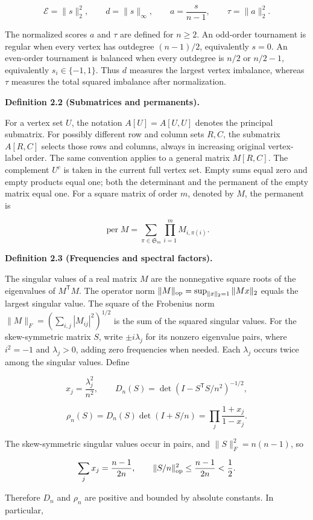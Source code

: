 \documentclass[11pt,a4paper]{article}
\begin{document}
\[
\mathcal E=\|s\|_2^2,\qquad d=\|s\|_\infty,\qquad
a=\frac{s}{n-1},\qquad \tau=\|a\|_2^2.
\]

The normalized scores \(a\) and \(\tau\) are defined for \(n\ge2\). An odd-order tournament is regular when every vertex has outdegree \((n-1)/2\), equivalently \(s=0\). An even-order tournament is balanced when every outdegree is \(n/2\) or \(n/2-1\), equivalently \(s_i\in\{-1,1\}\). Thus \(d\) measures the largest vertex imbalance, whereas \(\tau\) measures the total squared imbalance after normalization.

\textbf{Definition 2.2 (Submatrices and permanents).}

For a vertex set \(U\), the notation \(A[U]=A[U,U]\) denotes the principal submatrix. For possibly different row and column sets \(R,C\), the submatrix \(A[R,C]\) selects those rows and columns, always in increasing original vertex-label order. The same convention applies to a general matrix \(M[R,C]\). The complement \(U^c\) is taken in the current full vertex set. Empty sums equal zero and empty products equal one; both the determinant and the permanent of the empty matrix equal one. For a square matrix of order \(m\), denoted by \(M\), the permanent is

\[
\operatorname{per}M=\sum_{\pi\in\mathfrak S_m}\prod_{i=1}^m M_{i,\pi(i)}.
\]

\textbf{Definition 2.3 (Frequencies and spectral factors).}

The singular values of a real matrix \(M\) are the nonnegative square roots of the eigenvalues of \(M^{\mathsf T}M\). The operator norm \(\|M\|_{\rm op}=\sup_{\|x\|_2=1}\|Mx\|_2\) equals the largest singular value. The square of the Frobenius norm \(\|M\|_F=(\sum_{i,j}|M_{ij}|^2)^{1/2}\) is the sum of the squared singular values. For the skew-symmetric matrix \(S\), write \(\pm i\lambda_j\) for its nonzero eigenvalue pairs, where \(i^2=-1\) and \(\lambda_j>0\), adding zero frequencies when needed. Each \(\lambda_j\) occurs twice among the singular values. Define

\[
x_j=\frac{\lambda_j^2}{n^2},\qquad
D_n(S)=\det(I-S^{\mathsf T}S/n^2)^{-1/2},
\]

\[
\rho_n(S)=D_n(S)\det(I+S/n)=\prod_j\frac{1+x_j}{1-x_j}.
\]

The skew-symmetric singular values occur in pairs, and \(\|S\|_F^2=n(n-1)\), so

\[
\sum_jx_j=\frac{n-1}{2n},\qquad \|S/n\|_{\rm op}^2\le\frac{n-1}{2n}<\frac12.
\]

Therefore \(D_n\) and \(\rho_n\) are positive and bounded by absolute constants. In particular,
\end{document}

